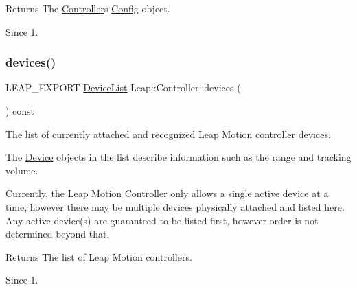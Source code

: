 \begin{DoxyCodeInclude}
\end{DoxyCodeInclude}


\begin{DoxyReturn}{Returns}
The \hyperlink{class_leap_1_1_controller}{Controller}\textquotesingle{}s \hyperlink{class_leap_1_1_config}{Config} object. 
\end{DoxyReturn}
\begin{DoxySince}{Since}
1. 
\end{DoxySince}
\mbox{\label{class_leap_1_1_controller_ad3b6ea558fb39cb32c20c3fd44dc5da1}} 
\subsubsection{\texorpdfstring{devices()}{devices()}}
{\footnotesize\ttfamily L\+E\+A\+P\+\_\+\+E\+X\+P\+O\+RT \hyperlink{class_leap_1_1_device_list}{Device\+List} Leap\+::\+Controller\+::devices (\begin{DoxyParamCaption}{ }\end{DoxyParamCaption}) const}

The list of currently attached and recognized Leap Motion controller devices.

The \hyperlink{class_leap_1_1_device}{Device} objects in the list describe information such as the range and tracking volume.


\begin{DoxyCodeInclude}
\end{DoxyCodeInclude}


Currently, the Leap Motion \hyperlink{class_leap_1_1_controller}{Controller} only allows a single active device at a time, however there may be multiple devices physically attached and listed here. Any active device(s) are guaranteed to be listed first, however order is not determined beyond that.

\begin{DoxyReturn}{Returns}
The list of Leap Motion controllers. 
\end{DoxyReturn}
\begin{DoxySince}{Since}
1. 
\end{DoxySince}
\mbox{\label{class_leap_1_1_controller_a3e7ee0e1418e1cee5274274d50f3a998}} 
